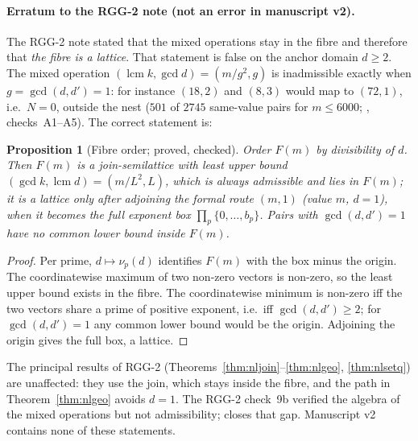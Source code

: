 \documentclass[11pt,a4paper]{article}
\newcommand{\lcm}{\operatorname{lcm}}
\theoremstyle{plain}
\newtheorem{proposition}[theorem]{Proposition}
\theoremstyle{definition}
\begin{document}
\paragraph{Erratum to the RGG-2 note (not an error in manuscript v2).}
The RGG-2 note stated that the mixed operations stay in the fibre and therefore that \emph{the fibre is a lattice}. That statement is false on the anchor domain $d\ge2$. The mixed operation $(\lcm k,\gcd d)=(m/g^2,g)$ is inadmissible exactly when $g=\gcd(d,d')=1$: for instance $(18,2)$ and $(8,3)$ would map to $(72,1)$, i.e.\ $N=0$, outside the nest ($501$ of $2745$ same-value pairs for $m\le6000$; , checks~A1--A5). The correct statement is:
\begin{proposition}[Fibre order; proved, checked]\label{prop:nlerratum}
Order $F(m)$ by divisibility of $d$. Then $F(m)$ is a \emph{join-semilattice} with least upper bound $(\gcd k,\lcm d)=(m/L^2,L)$, which is always admissible and lies in $F(m)$; it is a lattice only after adjoining the formal route $(m,1)$ (value $m$, $d=1$), when it becomes the full exponent box $\prod_p\{0,\dots,b_p\}$. Pairs with $\gcd(d,d')=1$ have no common lower bound inside $F(m)$.
\end{proposition}
\begin{proof}
Per prime, $d\mapsto\nu_p(d)$ identifies $F(m)$ with the box minus the origin. The coordinatewise maximum of two non-zero vectors is non-zero, so the least upper bound exists in the fibre. The coordinatewise minimum is non-zero iff the two vectors share a prime of positive exponent, i.e.\ iff $\gcd(d,d')\ge2$; for $\gcd(d,d')=1$ any common lower bound would be the origin. Adjoining the origin gives the full box, a lattice.
\end{proof}
\noindent The principal results of RGG-2 (Theorems~\ref{thm:nljoin}--\ref{thm:nlgeo}, \ref{thm:nlsetq}) are unaffected: they use the join, which stays inside the fibre, and the path in Theorem~\ref{thm:nlgeo} avoids $d=1$. The RGG-2 check~9b verified the algebra of the mixed operations but not admissibility;  closes that gap. Manuscript v2 contains none of these statements.

\end{document}
